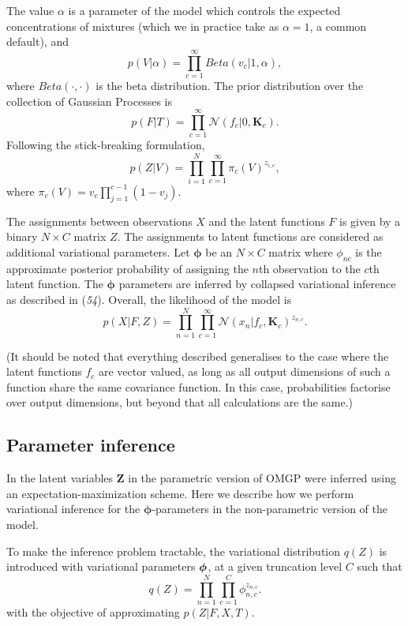 The value $ \alpha $ is a parameter of the model which controls the expected concentrations of mixtures (which we in practice take as $ \alpha = 1 $, a common default), and
\[ p(V | \alpha) = \prod_{c=1}^\infty  Beta(v_c | 1, \alpha), \]
where $ Beta(\cdot, \cdot) $ is the beta distribution. The prior distribution over the collection of Gaussian Processes is
\[ p(F | T) = \prod_{c=1}^\infty \mathcal{N}(f_c | 0, \bm{K}_c). \]
Following the stick-breaking formulation,
\[ p(Z | V) = \prod_{i=1}^N \prod_{c=1}^{\infty} \pi_c(V)^{z_{i,c}}, \]
where $ \pi_c(V) = v_c \prod_{j=1}^{c - 1} (1 - v_j) $.

The assignments between observations $ X $ and the latent functions $ F $ is given by a binary $ N \times C $ matrix $ Z $. The assignments to latent functions are considered as additional variational parameters. Let $ \bm{\phi} $ be an $ N \times C $ matrix where $ \phi_{nc} $ is the approximate posterior probability of assigning the $ n $th observation to the $ c $th latent function. The $ \bm{\phi} $ parameters are inferred by collapsed variational inference as described in ({\it 54}). Overall, the likelihood of the model is
\[
p(X | F, Z) = \prod_{n=1}^N \prod_{c=1}^{\infty} \mathcal{N}(x_n | f_c, \bm{K}_c )^{z_{n, c}}.
\]

(It should be noted that everything described generalises to the case where the latent functions
$ f_c $ are vector valued, as long as all output dimensions of such a function share the same
covariance function. In this case, probabilities factorise over output dimensions, but beyond that
all calculations are the same.)

\subsection{Parameter inference}

In \cite{Lazaro-Gredilla2012-ta} the latent variables $ \mathbf{Z} $ in the parametric version of OMGP were inferred using an expectation-maximization scheme. Here we describe how we perform variational inference for the $ \bm{\phi} $-parameters in the non-parametric version of the model.

To make the inference problem tractable, the variational distribution $ q(Z) $ is introduced with variational parameters $ \mbox{\boldmath $\phi$} $, at a given truncation level $ C $ such that
\[ q(Z) = \prod_{n=1}^N \prod_{c=1}^C \phi_{n,c}^{z_{n,c}}. \]
with the objective of approximating $ p(Z | F, X, T) $.

